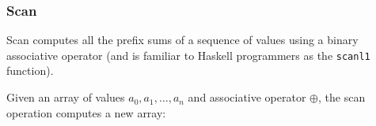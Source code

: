 









\subsubsection{Scan} 

Scan computes all the prefix sums of a sequence of values using 
a binary associative operator (and is familiar to Haskell
programmers as the {\tt scanl1} function).

Given an array of values $a_0,a_1,\ldots,a_n$ and associative operator $\oplus$,
the scan operation computes a new array: 

